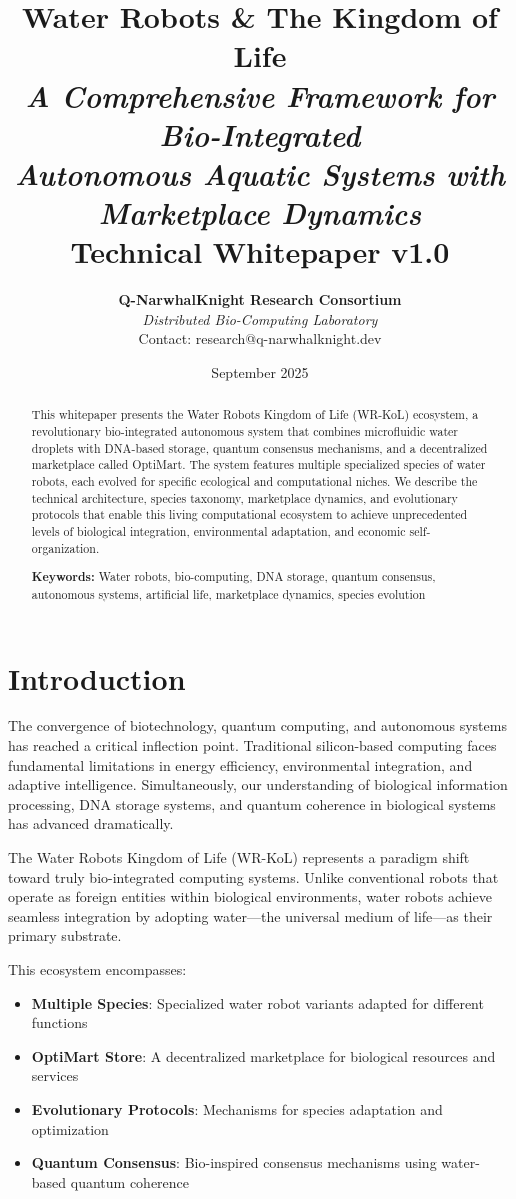 \documentclass[11pt,a4paper]{article}
\title{
    \vspace{-2cm}
    \Huge\textbf{Water Robots \& The Kingdom of Life}\\
    \vspace{0.3cm}
    \Large\textit{A Comprehensive Framework for Bio-Integrated\\
    Autonomous Aquatic Systems with Marketplace Dynamics}\\
    \vspace{0.5cm}
    \large Technical Whitepaper v1.0
}
\author{
    \textbf{Q-NarwhalKnight Research Consortium}\\
    \textit{Distributed Bio-Computing Laboratory}\\
    \vspace{0.2cm}
    \small{Contact: research@q-narwhalknight.dev}
}
\date{September 2025}
\begin{document}
\maketitle

\vspace{1cm}

\begin{abstract}
This whitepaper presents the Water Robots Kingdom of Life (WR-KoL) ecosystem, a revolutionary bio-integrated autonomous system that combines microfluidic water droplets with DNA-based storage, quantum consensus mechanisms, and a decentralized marketplace called OptiMart. The system features multiple specialized species of water robots, each evolved for specific ecological and computational niches. We describe the technical architecture, species taxonomy, marketplace dynamics, and evolutionary protocols that enable this living computational ecosystem to achieve unprecedented levels of biological integration, environmental adaptation, and economic self-organization.

\textbf{Keywords:} Water robots, bio-computing, DNA storage, quantum consensus, autonomous systems, artificial life, marketplace dynamics, species evolution
\end{abstract}

\newpage

\tableofcontents

\newpage

\section{Introduction}

The convergence of biotechnology, quantum computing, and autonomous systems has reached a critical inflection point. Traditional silicon-based computing faces fundamental limitations in energy efficiency, environmental integration, and adaptive intelligence. Simultaneously, our understanding of biological information processing, DNA storage systems, and quantum coherence in biological systems has advanced dramatically.

The Water Robots Kingdom of Life (WR-KoL) represents a paradigm shift toward truly bio-integrated computing systems. Unlike conventional robots that operate as foreign entities within biological environments, water robots achieve seamless integration by adopting water—the universal medium of life—as their primary substrate.

This ecosystem encompasses:
\begin{itemize}
    \item \textbf{Multiple Species}: Specialized water robot variants adapted for different functions
    \item \textbf{OptiMart Store}: A decentralized marketplace for biological resources and services
    \item \textbf{Evolutionary Protocols}: Mechanisms for species adaptation and optimization
    \item \textbf{Quantum Consensus}: Bio-inspired consensus mechanisms using water-based quantum coherence
\end{itemize}
\end{document}
